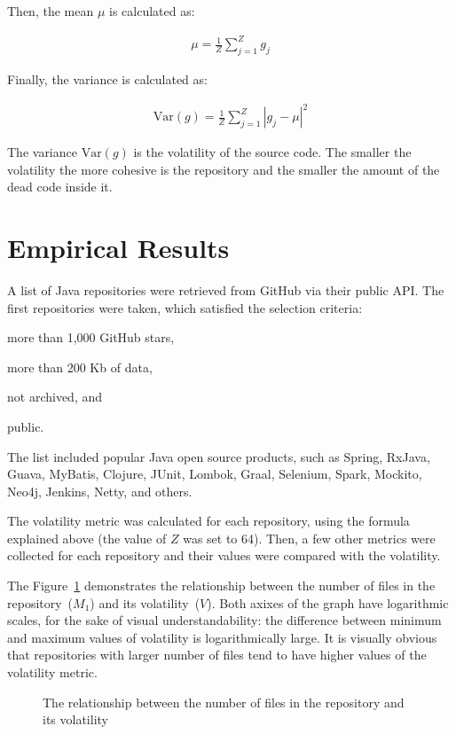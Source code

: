 \documentclass[sigconf]{acmart}
\begin{document}
Then, the mean $\mu$ is calculated as:

\begin{eqnarray}
\mu = \frac{1}{Z}\sum_{j=1}^{Z}{g_j}
\end{eqnarray}

Finally, the variance is calculated as:

\begin{eqnarray}
\text{Var}(g) = \frac{1}{Z}\sum_{j=1}^{Z}{|g_j - \mu|^2}
\end{eqnarray}

The variance $\text{Var}(g)$ is the volatility of the source code. The smaller
the volatility the more cohesive is the repository and the smaller
the amount of the dead code inside it.

\section{Empirical Results}
\label{sec:results}

A list of Java repositories were retrieved from GitHub via their
public API. The first \thetotalrepos{} repositories were taken, which satisfied
the selection criteria:
\begin{enumerate*}[label={\arabic*)}]
\item more than 1,000 GitHub stars,
\item more than 200 Kb of data,
\item not archived, and
\item public.
\end{enumerate*}
The list included popular Java open source products, such as
Spring, RxJava, Guava, MyBatis, Clojure, JUnit, Lombok,
Graal, Selenium, Spark, Mockito, Neo4j, Jenkins, Netty, and others.

The volatility metric was calculated for each repository, using the
formula explained above (the value of $Z$ was set to 64).
Then, a few other metrics were collected
for each repository and their values were compared with the volatility.

The Figure~\ref{fig:1} demonstrates the relationship between
the number of files in the repository~($M_1$) and its volatility~($V$). Both
axixes of the graph have logarithmic scales, for the sake of visual
understandability: the difference between minimum and maximum values
of volatility is logarithmically large. It is visually obvious that
repositories with larger number of files tend to have higher values
of the volatility metric.

\begin{figure}[h]
  
  \caption{The relationship between the number of files in the repository and its volatility}
  \label{fig:1}
\end{figure}
\end{document}
